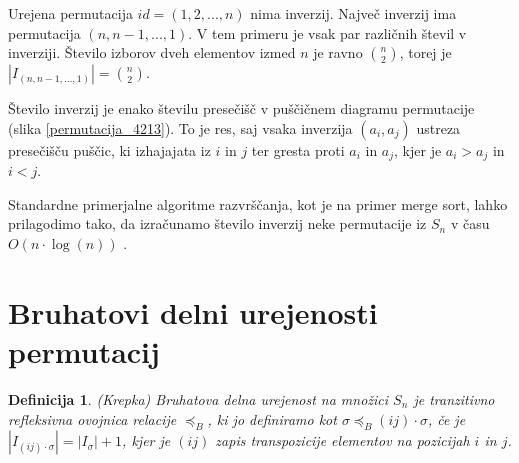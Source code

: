 \documentclass[a4paper, 12pt]{book}
\newtheorem{definicija}{Definicija}[chapter]
\begin{document}
Urejena permutacija $id = (1, 2, ..., n)$ nima inverzij. Največ inverzij ima permutacija $(n, n-1, ..., 1)$. V tem primeru je vsak par različnih števil v inverziji. Število izborov dveh elementov izmed $n$ je ravno $\binom{n}{2}$, torej je $|I_{(n, n-1, ..., 1)}| = \binom{n}{2}$.

Število inverzij je enako številu presečišč v puščičnem diagramu permutacije (slika \ref{permutacija_4213}). To je res, saj vsaka inverzija $(a_i, a_j)$ ustreza presečišču puščic, ki izhajajata iz $i$ in $j$ ter gresta proti $a_i$ in $a_j$, kjer je $a_i > a_j$ in $i < j$.

Standardne primerjalne algoritme razvrščanja, kot je na primer merge sort, lahko prilagodimo tako, da izračunamo število inverzij neke permutacije iz $S_n$ v času $O(n \cdot \log(n))$ \cite{algorithmDesign}.

\section{ Bruhatovi delni urejenosti permutacij}

\begin{definicija}    
    (Krepka) Bruhatova  delna urejenost na množici $S_n$ je tranzitivno refleksivna ovojnica relacije $\preceq_{B}$, ki jo definiramo kot $\sigma \preceq_{B} (ij) \cdot \sigma$, če je $|I_{(ij) \cdot \sigma}| = |I_{\sigma}| + 1$, kjer je $(ij)$ zapis transpozicije elementov na pozicijah $i$ in $j$.
\end{definicija}
\end{document}
